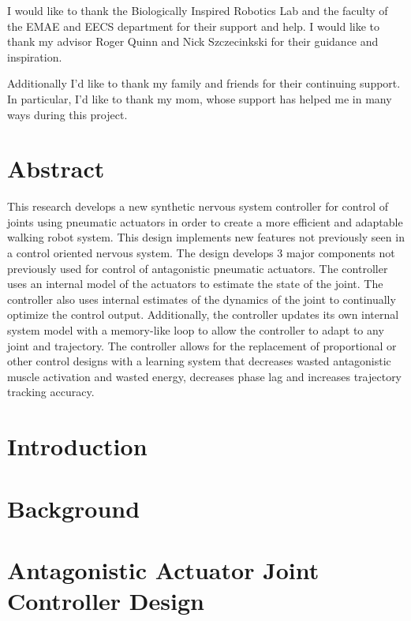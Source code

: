 \documentclass[12pt, letterpaper, oneside, onecolumn]{report} %
\begin{document}
I would like to thank the Biologically Inspired Robotics Lab and the faculty of
the EMAE and EECS department for their support and help. I would like to thank my advisor Roger Quinn and Nick Szczecinkski for their guidance and inspiration.

Additionally I'd like to thank my family and friends for their continuing support. In particular, I'd like to thank my mom, whose support has helped me in many ways during this project.

\chapter*{Abstract}
\label{chap:abstract}

This research develops a new synthetic nervous system controller for control of joints using pneumatic actuators in order to create a more efficient and adaptable walking robot system. This design implements new features not previously seen in a control oriented nervous system. The design develops 3 major components not previously used for control of antagonistic pneumatic actuators. The controller uses an internal model of the actuators to estimate the state of the joint. The controller also uses internal estimates of the dynamics of the joint to continually optimize the control output. Additionally, the controller updates its own internal system model with a memory-like loop to allow the controller to adapt to any joint and trajectory. The controller allows for the replacement of proportional or other control designs with a learning system that decreases wasted antagonistic muscle activation and wasted energy, decreases phase lag and increases trajectory tracking accuracy.

\chapter{Introduction}
\label{chap:introduction}



\chapter{Background}
\label{chap:lit_review}


\chapter{Antagonistic Actuator Joint Controller Design}
\label{chap:controller_design}

\end{document}

